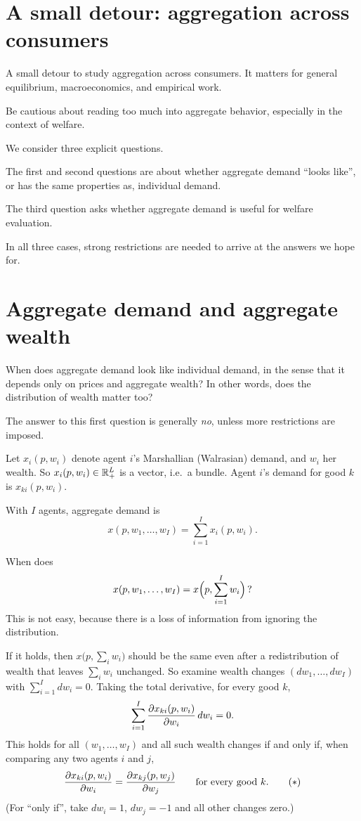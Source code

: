 \documentclass[11pt]{article}
\begin{document}


\section{A small detour: aggregation across consumers}

A small detour to study aggregation across consumers. It matters for general
equilibrium, macroeconomics, and empirical work.

 Be cautious about reading too much into aggregate
behavior, especially in the context of welfare.

We consider three explicit questions.
\begin{flatlist}
  \item The first and second questions are about whether aggregate demand
        ``looks like'', or has the same properties as, individual demand.
  \item The third question asks whether aggregate demand is useful for welfare
        evaluation.
\end{flatlist}
In all three cases, strong restrictions are needed to arrive at the answers we
hope for.

\section{Aggregate demand and aggregate wealth}

When does aggregate demand look like individual demand, in the sense that it
depends only on prices and aggregate wealth? In other words, does the
distribution of wealth matter too?

The answer to this first question is generally \emph{no}, unless more
restrictions are imposed.

 Let $x_i(p,w_i)$ denote agent $i$'s Marshallian (Walrasian)
demand, and $w_i$ her wealth. So $x_i(p,w_i)\in\mathbb{R}^L_+$ is a vector, i.e.\ a
bundle. Agent $i$'s demand for good $k$ is $x_{ki}(p,w_i)$.

With $I$ agents, aggregate demand is
\[ x(p,w_1,\dots,w_I)=\sum_{i=1}^{I}x_i(p,w_i). \]

When does
\[ x(p,w_1,\dots,w_I)=x\Bigl(p,\sum_{i=1}^{I}w_i\Bigr)\,? \]
This is not easy, because there is a loss of information from ignoring the
distribution.

If it holds, then $x\bigl(p,\sum_i w_i\bigr)$ should be the same even after a
redistribution of wealth that leaves $\sum_i w_i$ unchanged. So examine wealth
changes $(dw_1,\dots,dw_I)$ with $\sum_{i=1}^{I}dw_i=0$. Taking the total
derivative, for every good $k$,
\[ \sum_{i=1}^{I}\frac{\partial x_{ki}(p,w_i)}{\partial w_i}\,dw_i=0. \]
This holds for all $(w_1,\dots,w_I)$ and all such wealth changes if and only if,
when comparing any two agents $i$ and $j$,
\[ \frac{\partial x_{ki}(p,w_i)}{\partial w_i}=\frac{\partial x_{kj}(p,w_j)}{\partial w_j}
   \qquad\text{for every good }k. \tag{$*$} \]
(For ``only if'', take $dw_i=1$, $dw_j=-1$ and all other changes zero.)
\end{document}
